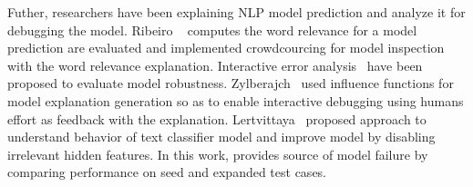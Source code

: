 %
Futher, researchers have been explaining NLP model prediction and
analyze it for debugging the model. Ribeiro
\textit{\etal}~\cite{ribeiroSG16lime} computes the word relevance for
a model prediction are evaluated and implemented crowdcourcing for
model inspection with the word relevance explanation.  Interactive
error analysis~\cite{wu2019errudite} have been proposed to evaluate
model robustness. Zylberajch~\cite{zylberajch2021hildif} used
influence functions for model explanation generation so as to enable
interactive debugging using humans effort as feedback with the
explanation. Lertvittaya~\cite{lertvittayakumjorn2020find} proposed
approach to understand behavior of text classifier model and improve
model by disabling irrelevant hidden features. In this work, \tool
provides source of model failure by comparing performance on seed and
expanded test cases.


